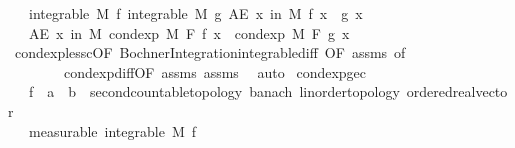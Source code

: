 \begin{isabellebody}
\ \ \ {\isachardoublequoteopen}integrable\ M\ f{\isachardoublequoteclose}\ {\isachardoublequoteopen}integrable\ M\ g{\isachardoublequoteclose}\ {\isachardoublequoteopen}AE\ x\ in\ M{\isachardot}{\kern0pt}\ f\ x\ {\isacharless}{\kern0pt}\ g\ x{\isachardoublequoteclose}\isanewline
\ \ \ {\isachardoublequoteopen}AE\ x\ in\ M{\isachardot}{\kern0pt}\ cond{\isacharunderscore}{\kern0pt}exp\ M\ F\ f\ x\ {\isacharless}{\kern0pt}\ cond{\isacharunderscore}{\kern0pt}exp\ M\ F\ g\ x{\isachardoublequoteclose}\isanewline
%
\isadelimproof
\ \ %
\endisadelimproof
%
\isatagproof
{}\isamarkupfalse%
\ cond{\isacharunderscore}{\kern0pt}exp{\isacharunderscore}{\kern0pt}less{\isacharunderscore}{\kern0pt}c{\isacharbrackleft}{\kern0pt}OF\ Bochner{\isacharunderscore}{\kern0pt}Integration{\isachardot}{\kern0pt}integrable{\isacharunderscore}{\kern0pt}diff{\isacharcomma}{\kern0pt}\ OF\ assms{\isacharparenleft}{\kern0pt}{}{\isacharcomma}{\kern0pt}{}{\isacharparenright}{\kern0pt}{\isacharcomma}{\kern0pt}\ of\ {}{\isacharbrackright}{\kern0pt}\ \isanewline
\ \ \ \ \ \ \ \ cond{\isacharunderscore}{\kern0pt}exp{\isacharunderscore}{\kern0pt}diff{\isacharbrackleft}{\kern0pt}OF\ assms{\isacharparenleft}{\kern0pt}{}{\isacharcomma}{\kern0pt}{}{\isacharparenright}{\kern0pt}{\isacharbrackright}{\kern0pt}\ assms{\isacharparenleft}{\kern0pt}{}{\isacharparenright}{\kern0pt}\ \isamarkupfalse%
\ auto%
\endisatagproof
{\isafoldproof}%
%
\isadelimproof
\isanewline
%
\endisadelimproof
\isanewline
{}\isamarkupfalse%
\ cond{\isacharunderscore}{\kern0pt}exp{\isacharunderscore}{\kern0pt}ge{\isacharunderscore}{\kern0pt}c{\isacharcolon}{\kern0pt}\isanewline
\ \ \ f\ {\isacharcolon}{\kern0pt}{\isacharcolon}{\kern0pt}\ {\isachardoublequoteopen}{\isacharprime}{\kern0pt}a\ {\isasymRightarrow}\ {\isacharprime}{\kern0pt}b\ {\isacharcolon}{\kern0pt}{\isacharcolon}{\kern0pt}\ {\isacharbraceleft}{\kern0pt}second{\isacharunderscore}{\kern0pt}countable{\isacharunderscore}{\kern0pt}topology{\isacharcomma}{\kern0pt}\ banach{\isacharcomma}{\kern0pt}\ linorder{\isacharunderscore}{\kern0pt}topology{\isacharcomma}{\kern0pt}\ ordered{\isacharunderscore}{\kern0pt}real{\isacharunderscore}{\kern0pt}vector{\isacharbraceright}{\kern0pt}{\isachardoublequoteclose}\isanewline
\ \ \ {\isacharbrackleft}{\kern0pt}measurable{\isacharbrackright}{\kern0pt}{\isacharcolon}{\kern0pt}\ {\isachardoublequoteopen}integrable\ M\ f{\isachardoublequoteclose}\ \ \ \ \ \ \ \ \ \ \ \ \ \ \ \ \ \ \ \ \ \ \ \ \ \ \ \ \ \ \ \ \ \ \ \ \ \ \ \ \ \ \ \ \ \ \ \ \ \ \ \ \ \ \ \ \ \ \ \ \ \ \ \isanewline

\end{isabellebody}
